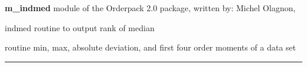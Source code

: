 \begin{modules}
  \begin{sulist}{} %
  \item[\textbf{m\_indmed}] module of the Orderpack 2.0 package, written by:
  Michel Olagnon,  
  \item[indmed] routine to output rank of median
  \end{sulist}
\end{modules}

\begin{related}
  \begin{sulist}{} %
  \item[\htmlref{compute\_statistics}{sub:compute_statistics}] routine min, max,
  absolute deviation, and first four order moments of a data set
  \end{sulist}
\end{related}

\rule{\hsize}{2mm}

\newpage
